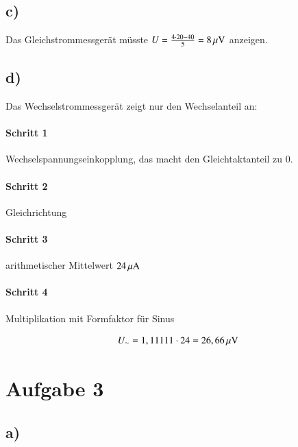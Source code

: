 \subsection*{c)}

Das Gleichstrommessgerät müsste $U = \frac{4 \cdot 20 - 40}{5} = \unit[8]{\mu V}$ anzeigen.


\subsection*{d)}

Das Wechselstrommessgerät zeigt nur den Wechselanteil an:

\paragraph{Schritt 1}

Wechselspannungseinkopplung, das macht den Gleichtaktanteil zu 0.

\paragraph{Schritt 2}

Gleichrichtung

\paragraph{Schritt 3}

arithmetischer Mittelwert $\unit[24]{\mu A}$

\paragraph{Schritt 4}

Multiplikation mit Formfaktor für Sinus

\begin{align*}
U_\sim = 1,11111 \cdot 24 = \unit[26,66]{\mu V}
\end{align*}


\section{Aufgabe 3}

\subsection*{a)}


